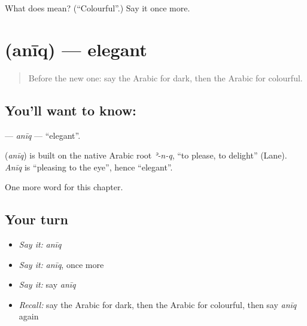 \begin{tcolorbox}[breakable,colback=teal!4,colframe=teal!35!black,title={Before you move on}]
What does  mean? (\textquotedblleft{}Colourful\textquotedblright{}.) Say it once more.
\end{tcolorbox}
\section[\texorpdfstring{\ar{أنيق} (anīq)}{أنيق (anīq)}]{ (anīq) — elegant}

\label{lesson:AR-C149-aniq}



\begin{quote}
Before the new one: say the Arabic for dark, then the Arabic for colourful.
\end{quote}

\subsection*{You'll want to know: }
\textbf{} — \emph{anīq} — \textquotedblleft{}elegant\textquotedblright{}.

\begin{cousinweb}
\textbf{} (\emph{anīq}) is built on the native Arabic root \emph{ʾ-n-q}, \textquotedblleft{}to please, to delight\textquotedblright{} (Lane). \emph{Anīq} is \textquotedblleft{}pleasing to the eye\textquotedblright{}, hence \textquotedblleft{}elegant\textquotedblright{}.
\end{cousinweb}

\begin{grammarlens}[title={What you've built}]
One more word for this chapter.
\end{grammarlens}

\subsection*{Your turn}
\begin{itemize}
\raggedright
  \item \emph{Say it:} \emph{anīq}
  \item \emph{Say it:} \emph{anīq}, once more
  \item \emph{Say it:} say \emph{anīq}
  \item \emph{Recall:} say the Arabic for dark, then the Arabic for colourful, then say \emph{anīq} again
\end{itemize}

